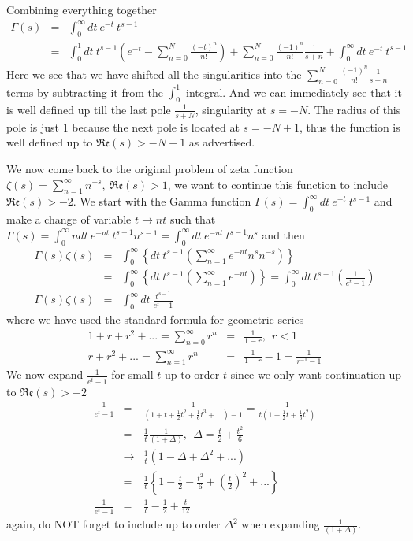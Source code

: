 \documentclass[aps,preprint,preprintnumbers,nofootinbib,showpacs,prd]{revtex4-1}
\newcommand{\bea}{\begin{eqnarray}}
\newcommand{\eea}{\end{eqnarray}}
\newcommand{\nbea}{\begin{eqnarray*}}
\newcommand{\neea}{\end{eqnarray*}}
\begin{document}
Combining everything together
%
\bea
\Gamma(s) & = & \int_0^\infty dt ~ e^{-t}~t^{s-1} \nonumber \\
& = & \int_0^1 dt ~ t^{s-1} \left ( e^{-t} -\sum\limits_{n=0}^{N} \frac{(-t)^n}{n!} \right )  + \sum\limits_{n=0}^{N} \frac{(-1)^n}{n!} \frac{1}{s+n} + \int_0^\infty dt ~ e^{-t}~t^{s-1}
\label{Eq:Prob3.6}
\eea
%
Here we see that we have shifted all the singularities into the $\sum\limits_{n=0}^{N} \frac{(-1)^n}{n!} \frac{1}{s+n}$ terms by subtracting it from the $\int_0^1$ integral. And we can immediately see that it is well defined up till the last pole $\frac{1}{s + N}$, singularity at $s = -N$. The radius of this pole is just 1 because the next pole is located at $s = -N + 1$, thus the function is well defined up to $\mathfrak{Re}(s) > - N - 1$ as advertised.

We now come back to the original problem of zeta function $\zeta(s) = \sum\limits_{n=1}^{\infty} n^{-s},~\mathfrak{Re}(s) > 1$, we want to continue this function to include $\mathfrak{Re}(s) > -2$. We start with the Gamma function $\Gamma(s) = \int_0^\infty dt ~e^{-t} ~ t^{s-1}$ and make a change of variable $t \rightarrow nt$ such that $\Gamma(s) = \int_0^\infty n dt~e^{-nt} ~ t^{s-1} n^{s-1} = \int_0^\infty dt~e^{-nt} ~ t^{s-1} n^{s}$ and then
%
\nbea
\Gamma(s)\zeta(s) & = & \int_0^\infty \left \{ dt~ t^{s-1} \left ( \sum\limits_{n=1}^{\infty}e^{-nt}  n^{s} n^{-s} \right ) \right \} \\
& = & \int_0^\infty \left \{ dt~ t^{s-1} \left ( \sum\limits_{n=1}^{\infty}e^{-nt} \right ) \right \} = \int_0^\infty dt~ t^{s-1} \left ( \frac{1}{e^t - 1} \right ) \\
\Gamma(s)\zeta(s) & = & \int_0^\infty dt~ \frac{t^{s-1}}{e^t - 1}
\neea
%
where we have used the standard formula for geometric series
%
\nbea
1 + r + r^2 + ... = \sum_{n=0}^{\infty} r^n & = & \frac{1}{1 - r}, ~~r < 1 \\
r + r^2 + ... = \sum_{n=1}^{\infty} r^n & = & \frac{1}{1 - r} - 1 = \frac{1}{r^{-1} - 1}
\neea
%
We now expand $\frac{1}{e^t - 1}$ for small $t$ up to order $t$ since we only want continuation up to $\mathfrak{Re}(s) > -2$
%
\nbea
\frac{1}{e^t - 1} & = & \frac{1}{(1 + t + \frac{1}{2}t^2 + \frac{1}{6}t^3 + ...) - 1} = \frac{1}{t(1 + \frac{1}{2}t + \frac{1}{6}t^2)} \\
& = & \frac{1}{t}\frac{1}{(1 + \Delta)}, ~~ \Delta = \frac{t}{2} + \frac{t^2}{6} \\
& \rightarrow & \frac{1}{t} (1 - \Delta + \Delta^2 + ...) \\
& = & \frac{1}{t} \left \{ 1 - \frac{t}{2} - \frac{t^2}{6} + \left ( \frac{t}{2}\right ) ^2 + ... \right \} \\
\frac{1}{e^t - 1} & = & \frac{1}{t} - \frac{1}{2} + \frac{t}{12}
\neea
%
again, do NOT forget to include up to order $\Delta^2$ when expanding $\frac{1}{(1 + \Delta)}$.
\end{document}
